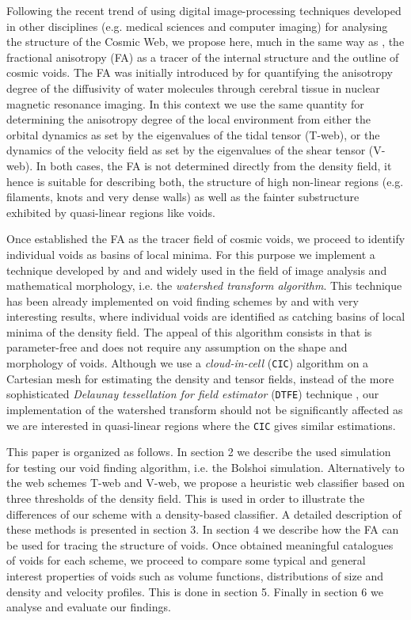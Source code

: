 \documentclass[a4,useAMS,usenatbib,usegraphicx]{latex/mn2e}
\begin{document}
Following the recent trend of using digital image-processing techniques 
developed in other disciplines (e.g. medical sciences and computer imaging) 
for analysing the structure of the Cosmic Web, we propose here, much in 
the same way as \citet{Libeskind13}, the fractional anisotropy (FA) as a 
tracer of the internal structure and the outline of cosmic voids. The FA 
was initially introduced by \citet{Basser95} for quantifying the 
anisotropy degree of the diffusivity of water molecules through cerebral
tissue in nuclear magnetic resonance imaging. In this context we use the 
same quantity for determining the anisotropy degree of the local 
environment from either the orbital dynamics as set by the eigenvalues of
the tidal tensor (T-web), or the dynamics of the velocity field as set by 
the eigenvalues of the shear tensor (V-web). In both cases, the FA is not
determined directly from the density field, it hence is suitable for 
describing both, the structure of high non-linear regions (e.g. filaments,
knots and very dense walls) as well as the fainter substructure exhibited 
by quasi-linear regions like voids.


Once established the FA as the tracer field of cosmic voids, we proceed to
identify individual voids as basins of local minima. For this purpose we
implement a technique developed by \citet{Beucher79} and \citet{Beucher93} 
and widely used in the field of image analysis and mathematical morphology, 
i.e. the \textit{watershed transform algorithm}. This technique has been 
already implemented on void finding schemes by \citet{Platen07} and 
\citet{Neyrinck08} with very interesting results, where individual voids 
are identified as catching basins of local minima of the density field. 
The appeal of this algorithm consists in that is parameter-free and does 
not require any assumption on the shape and morphology of voids. 
Although we use a \textit{cloud-in-cell} (\texttt{CIC}) algorithm on a 
Cartesian mesh for estimating the density and tensor fields, instead of 
the more sophisticated \textit{Delaunay tessellation for field estimator} 
(\texttt{DTFE}) technique \citep{Schaap00}, our implementation of the 
watershed transform should not be significantly affected as we are 
interested in quasi-linear regions where the \texttt{CIC} gives similar 
estimations.


This paper is organized as follows. In section 2 we describe the used
simulation for testing our void finding algorithm, i.e. the Bolshoi
simulation. Alternatively to the web schemes T-web and V-web, we propose 
a heuristic web classifier based on three thresholds of the density field. 
This is used in order to illustrate the differences of our scheme with a
density-based classifier. A detailed description of these methods is 
presented in section 3. In section 4 we describe how the FA can be used 
for tracing the structure of voids. Once obtained meaningful catalogues 
of voids for each scheme, we proceed to compare some typical and general 
interest properties of voids such as volume functions, distributions of 
size and density and velocity profiles. This is done in section 5. Finally 
in section 6 we analyse and evaluate our findings.
\end{document}
